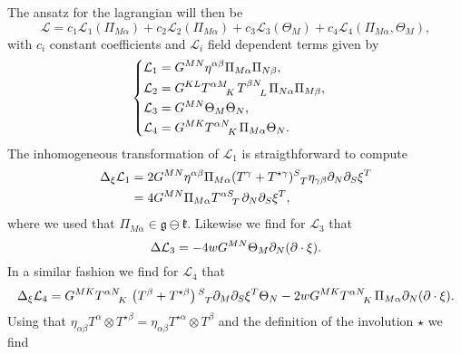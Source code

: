 The ansatz for the lagrangian will then be
\begin{equation}
    \mathcal{L} = c_1\mathcal{L}_1(\Pi_{M\alpha})+c_2\mathcal{L}_2(\Pi_{M\alpha})+c_3\mathcal{L}_3(\Theta_M)+c_4\mathcal{L}_4(\Pi_{M\alpha},\Theta_M),
\end{equation}
with $c_i$ constant coefficients and $\mathcal{L}_i$ field dependent terms given by 
\begin{equation}
    \begin{cases}\begin{aligned}
        \mathcal{L}_1 &= G^{MN}\eta^{\alpha\beta}\Pi_{M\alpha}\Pi_{N\beta},\\
        \mathcal{L}_2 &= G^{KL}\tensor{T}{^{\alpha M}_K}\tensor{T}{^{\beta N}_L}\Pi_{N\alpha}\Pi_{M\beta},\\
        \mathcal{L}_3 &= G^{MN}\Theta_M\Theta_N,\\
        \mathcal{L}_4 &= G^{MK}\tensor{T}{^{\alpha N}_K}\Pi_{M\alpha}\Theta_{N}.
    \end{aligned}
    \end{cases}
\end{equation}
The inhomogeneous transformation of $\mathcal{L}_1$ is straigthforward to compute
\begin{equation}
    \begin{aligned}
        \Delta_\xi \mathcal{L}_1 &= 2G^{MN}\eta^{\alpha\beta}\Pi_{M\alpha}(T^{\gamma}+T^{\star\gamma})\tensor{}{^S_T}\eta_{\gamma\beta}\pd_N\pd_S\xi^T\\
        &= 4G^{MN}\Pi_{M\alpha}\tensor{T}{^{\alpha S}_T}\pd_N\pd_S\xi^T,
    \end{aligned}
\end{equation}
where we used that $\Pi_{M\alpha}\in\mathfrak{g}\ominus\mathfrak{k}$. Likewise we find for $\mathcal{L}_3$ that 
\begin{equation}
    \Delta \mathcal{L}_3 = -4wG^{MN}\Theta_M\partial_N(\partial\cdot \xi).
\end{equation}
In a similar fashion we find for $\mathcal{L}_4$ that 
\begin{equation}
        \Delta_\xi \mathcal{L}_4 = G^{MK}\tensor{T}{^{\alpha N}_K}\left(T^\beta+T^{\star\beta}\right)\tensor{}{^S_T}\pd_M\pd_S\xi^T\Theta_N-2wG^{MK}\tensor{T}{^{\alpha N}_K}\Pi_{M\alpha}\pd_N(\pd\cdot \xi).
\end{equation}
Using that $\eta_{\alpha\beta}T^\alpha\otimes T^{\star\beta} = \eta_{\alpha\beta}T^{\star\alpha}\otimes T^{\beta}$ and the definition of the involution $\star$ we find 
